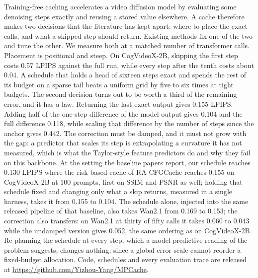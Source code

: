 Training-free caching accelerates a video diffusion model by evaluating some denoising steps exactly and reusing a stored value elsewhere. A cache therefore makes two decisions that the literature has kept apart: where to place the exact calls, and what a skipped step should return. Existing methods fix one of the two and tune the other. We measure both at a matched number of transformer calls. Placement is positional and steep. On CogVideoX-2B, skipping the first step costs 0.57 LPIPS against the full run, while every step after the tenth costs about 0.04. A schedule that holds a head of sixteen steps exact and spends the rest of its budget on a sparse tail beats a uniform grid by five to six times at tight budgets. The second decision turns out to be worth a third of the remaining error, and it has a law. Returning the last exact output gives 0.155 LPIPS. Adding half of the one-step difference of the model output gives 0.104 and the full difference 0.118, while scaling that difference by the number of steps since the anchor gives 0.442. The correction must be damped, and it must not grow with the gap: a predictor that scales its step is extrapolating a curvature it has not measured, which is what the Taylor-style feature predictors do and why they fail on this backbone. At the setting the baseline papers report, our schedule reaches 0.130 LPIPS where the risk-based cache of RA-CFGCache reaches 0.155 on CogVideoX-2B at 100 prompts, first on SSIM and PSNR as well; holding that schedule fixed and changing only what a skip returns, measured in a single harness, takes it from 0.155 to 0.104. The schedule alone, injected into the same released pipeline of that baseline, also takes Wan2.1 from 0.169 to 0.153; the correction also transfers: on Wan2.1 at thirty of fifty calls it takes 0.060 to 0.043 while the undamped version gives 0.052, the same ordering as on CogVideoX-2B. Re-planning the schedule at every step, which a model-predictive reading of the problem suggests, changes nothing, since a global error scale cannot reorder a fixed-budget allocation. Code, schedules and every evaluation trace are released at \url{https://github.com/Yizhou-Yang/MPCache}.
